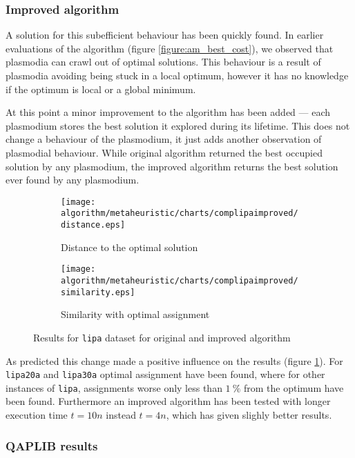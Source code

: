 \subsubsection{Improved algorithm}

A solution for this subefficient behaviour has been quickly found. In earlier evaluations of the algorithm (figure \ref{figure:am_best_cost}), we observed that plasmodia can crawl out of optimal solutions. This behaviour is a result of plasmodia avoiding being stuck in a local optimum, however it has no knowledge if the optimum is local or a global minimum. 

At this point a minor improvement to the algorithm has been added --- each plasmodium stores the best solution it explored during its lifetime. This does not change a behaviour of the plasmodium, it just adds another observation of plasmodial behaviour. While original algorithm returned the best occupied solution by any plasmodium, the improved algorithm returns the best solution ever found by any plasmodium.

\begin{figure}
  \centering

  \begin{subfigure}{0.9\textwidth}
    \texttt{[image: algorithm/metaheuristic/charts/complipaimproved/distance.eps]}
    \caption{Distance to the optimal solution}
  \end{subfigure}
  \begin{subfigure}{0.9\textwidth}
    \texttt{[image: algorithm/metaheuristic/charts/complipaimproved/similarity.eps]}
    \caption{Similarity with optimal assignment}
  \end{subfigure}
  
  \caption{Results for \texttt{lipa} dataset for original and improved algorithm}
  \label{figure:am_lipa_results_improved}
\end{figure}

As predicted this change made a positive influence on the results (figure \ref{figure:am_lipa_results_improved}). For \texttt{lipa20a} and \texttt{lipa30a} optimal assignment have been found, where for other instances of \texttt{lipa}, assignments worse only less than $1~\%$ from the optimum have been found. Furthermore an improved algorithm has been tested with longer execution time $t=10n$ instead $t=4n$, which has given slighly better results.


\subsubsection{QAPLIB results}
